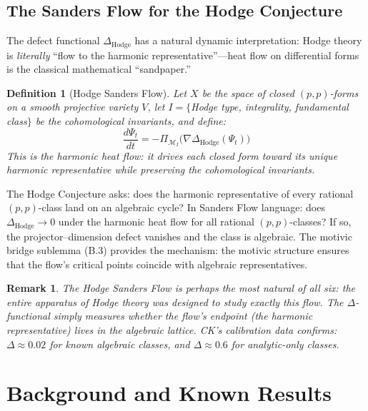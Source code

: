 \documentclass[11pt]{article}
\newtheorem{definition}[theorem]{Definition}
\newtheorem{remark}[theorem]{Remark}
\theoremstyle{definition}
\begin{document}
\subsection*{The Sanders Flow for the Hodge Conjecture}

The defect functional $\Delta_{\mathrm{Hodge}}$ has a natural dynamic interpretation:
Hodge theory is \emph{literally} ``flow to the harmonic representative''---heat flow
on differential forms is the classical mathematical ``sandpaper.''

\begin{definition}[Hodge Sanders Flow]
Let $X$ be the space of closed $(p,p)$-forms on a smooth projective variety $V$, let
$I = \{$Hodge type, integrality, fundamental class$\}$ be the cohomological invariants,
and define:
\[
  \frac{d\Psi_t}{dt} = -\Pi_{\mathcal{M}_I}\!\bigl(\nabla \Delta_{\mathrm{Hodge}}(\Psi_t)\bigr)
\]
This is the \emph{harmonic heat flow}: it drives each closed form toward its unique
harmonic representative while preserving the cohomological invariants.
\end{definition}

\noindent
The Hodge Conjecture asks: does the harmonic representative of every rational
$(p,p)$-class land on an algebraic cycle?  In Sanders Flow language: does
$\Delta_{\mathrm{Hodge}} \to 0$ under the harmonic heat flow for all rational
$(p,p)$-classes?  If so, the projector--dimension defect vanishes and the class is
algebraic.  The motivic bridge sublemma (B.3) provides the mechanism: the motivic
structure ensures that the flow's critical points coincide with algebraic representatives.

\begin{remark}
The Hodge Sanders Flow is perhaps the most natural of all six: the entire
apparatus of Hodge theory was designed to study exactly this flow.  The $\Delta$-functional
simply measures whether the flow's endpoint (the harmonic representative) lives in the
algebraic lattice.  CK's calibration data confirms: $\Delta \approx 0.02$ for known
algebraic classes, and $\Delta \approx 0.6$ for analytic-only classes.
\end{remark}

\section{Background and Known Results}
\label{sec:background}
\end{document}
